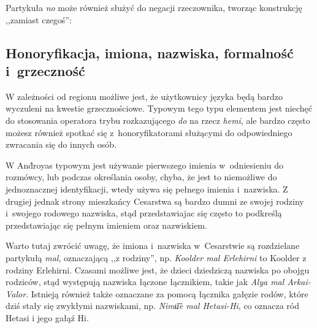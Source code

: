 \begin{spacing}{1.1}
Partykuła \emph{no} może również służyć do negacji rzeczownika, tworząc
konstrukcję ,,zamiast czegoś'':


\subsection{Honoryfikacja, imiona, nazwiska, formalność i~grzeczność}

W zależności od regionu możliwe jest, że użytkownicy języka będą bardzo
wyczuleni na kwestie grzecznościowe. Typowym tego typu elementem jest niechęć do
stosowania operatora trybu rozkazującego \emph{do} na rzecz \emph{hemi}, ale
bardzo często możesz również spotkać się z~honoryfikatorami służącymi do
odpowiedniego zwracania się do innych osób.

W And́royas typowym jest używanie pierwszego imienia w~odniesieniu do rozmówcy,
lub podczas określania osoby, chyba, że jest to niemożliwe do jednoznacznej
identyfikacji, wtedy używa się pełnego imienia i~nazwiska. Z drugiej jednak
strony mieszkańcy Cesarstwa są bardzo dumni ze swojej rodziny i~swojego rodowego
nazwiska, stąd przedstawiajac się często to podkreślą przedstawiając się pełnym
imieniem oraz nazwiskiem.


Warto tutaj zwrócić uwagę, że imiona i~nazwiska w~Cesarstwie są rozdzielane
partykułą \emph{mal}, oznaczającą ,,z rodziny'', np. \emph{Koolder mal
Erlehirni} to Koolder z rodziny Erlehirni. Czasami możliwe jest, że dzieci
dziedziczą nazwiska po obojgu rodziców, stąd występują nazwiska łączone
łącznikiem, takie jak \emph{Alya mal Arkai-Valor}. Istnieją również także
oznaczane za pomocą łącznika gałęzie rodów, które dziś stały się zwykłymi
nazwiskami, np. \emph{Nimu͞e mal Hetasi-Hi}, co oznacza ród Hetasi i jego gałąź
Hi.

\skipline


\end{spacing}
